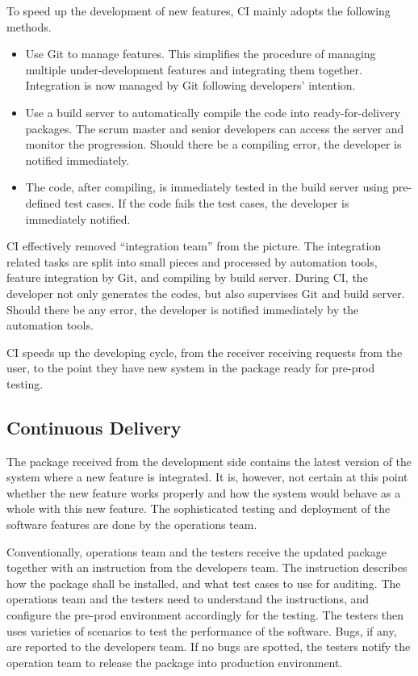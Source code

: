 To speed up the development of new features, CI mainly adopts the following methods.
\begin{itemize}
	\item Use Git to manage features. This simplifies the procedure of managing multiple under-development features and integrating them together. Integration is now managed by Git following developers' intention.
	\item Use a build server to automatically compile the code into ready-for-delivery packages. The scrum master and senior developers can access the server and monitor the progression. Should there be a compiling error, the developer is notified immediately.
	\item The code, after compiling, is immediately tested in the build server using pre-defined test cases. If the code fails the test cases, the developer is immediately notified.
\end{itemize}

CI effectively removed ``integration team'' from the picture. The integration related tasks are split into small pieces and processed by automation tools, feature integration by Git, and compiling by build server. During CI, the developer not only generates the codes, but also supervises Git and build server. Should there be any error, the developer is notified immediately by the automation tools.

CI speeds up the developing cycle, from the receiver receiving requests from the user, to the point they have new system in the package ready for pre-prod testing.

\subsection{Continuous Delivery}

The package received from the development side contains the latest version of the system where a new feature is integrated. It is, however, not certain at this point whether the new feature works properly and how the system would behave as a whole with this new feature. The sophisticated testing and deployment of the software features are done by the operations team.

Conventionally, operations team and the testers receive the updated package together with an instruction from the developers team. The instruction describes how the package shall be installed, and what test cases to use for auditing. The operations team and the testers need to understand the instructions, and configure the pre-prod environment accordingly for the testing. The testers then uses varieties of scenarios to test the performance of the software. Bugs, if any, are reported to the developers team. If no bugs are spotted, the testers notify the operation team to release the package into production environment.

